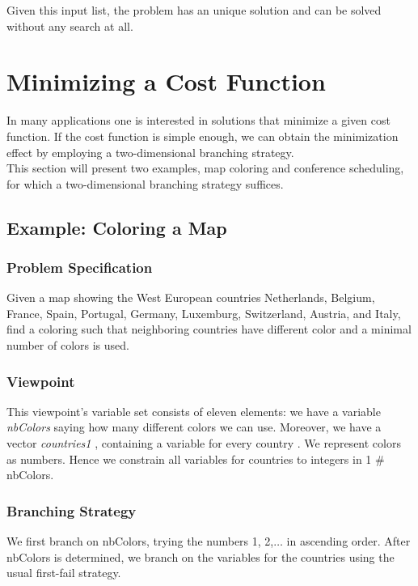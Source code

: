 \documentclass[a4paper]{scrartcl}
\begin{document}
Given this input list, the problem has an unique solution and can be solved
without any search at all.






\newpage
\section{Minimizing a Cost Function}
In many applications one is interested in solutions 
that minimize a given cost function. If the cost function 
is simple enough, we can obtain the minimization effect by 
employing a two-dimensional branching strategy.\\

This section will present two examples, map coloring and 
conference scheduling, for which a two-dimensional branching 
strategy suffices. 

\subsection{Example: Coloring a Map}
\subsubsection{Problem Specification}
Given a map showing the West European countries Netherlands, 
Belgium, France, Spain, Portugal, Germany, Luxemburg, Switzerland, 
Austria, and Italy, find a coloring such that neighboring 
countries have different color and a minimal number of colors is used. 

\subsubsection{Viewpoint}
This viewpoint's variable set consists of eleven elements:
we have a variable {\it nbColors} saying how many different colors we can use. 
Moreover, we have a vector {\it countries1 }, containing a variable for every country .
We represent colors as numbers. Hence we constrain all variables 
for countries to integers in 1 $\#$ nbColors. 

\subsubsection{Branching Strategy}
We first branch on nbColors, trying the numbers 1, 2,$\ldots$ in ascending order. 
After nbColors is determined, we branch on the variables for the 
countries using the usual first-fail strategy. 
\end{document}
